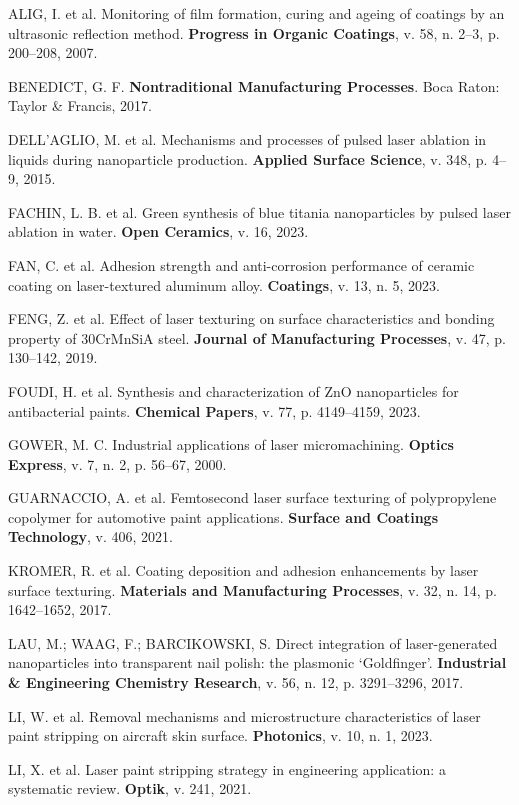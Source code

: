 \documentclass[
  12pt,
  a4paper,
  oneside,
  brazil,
  chapter=TITLE
]{article}
\begin{document}
ALIG, I. et al. Monitoring of film formation, curing and ageing of coatings by an ultrasonic reflection method. \textbf{Progress in Organic Coatings}, v. 58, n. 2--3, p. 200--208, 2007.

BENEDICT, G. F. \textbf{Nontraditional Manufacturing Processes}. Boca Raton: Taylor \& Francis, 2017.

DELL'AGLIO, M. et al. Mechanisms and processes of pulsed laser ablation in liquids during nanoparticle production. \textbf{Applied Surface Science}, v. 348, p. 4--9, 2015.

FACHIN, L. B. et al. Green synthesis of blue titania nanoparticles by pulsed laser ablation in water. \textbf{Open Ceramics}, v. 16, 2023.

FAN, C. et al. Adhesion strength and anti-corrosion performance of ceramic coating on laser-textured aluminum alloy. \textbf{Coatings}, v. 13, n. 5, 2023.

FENG, Z. et al. Effect of laser texturing on surface characteristics and bonding property of 30CrMnSiA steel. \textbf{Journal of Manufacturing Processes}, v. 47, p. 130--142, 2019.

FOUDI, H. et al. Synthesis and characterization of ZnO nanoparticles for antibacterial paints. \textbf{Chemical Papers}, v. 77, p. 4149--4159, 2023.

GOWER, M. C. Industrial applications of laser micromachining. \textbf{Optics Express}, v. 7, n. 2, p. 56--67, 2000.

GUARNACCIO, A. et al. Femtosecond laser surface texturing of polypropylene copolymer for automotive paint applications. \textbf{Surface and Coatings Technology}, v. 406, 2021.

KROMER, R. et al. Coating deposition and adhesion enhancements by laser surface texturing. \textbf{Materials and Manufacturing Processes}, v. 32, n. 14, p. 1642--1652, 2017.

LAU, M.; WAAG, F.; BARCIKOWSKI, S. Direct integration of laser-generated nanoparticles into transparent nail polish: the plasmonic `Goldfinger'. \textbf{Industrial \& Engineering Chemistry Research}, v. 56, n. 12, p. 3291--3296, 2017.

LI, W. et al. Removal mechanisms and microstructure characteristics of laser paint stripping on aircraft skin surface. \textbf{Photonics}, v. 10, n. 1, 2023.

LI, X. et al. Laser paint stripping strategy in engineering application: a systematic review. \textbf{Optik}, v. 241, 2021.
\end{document}
